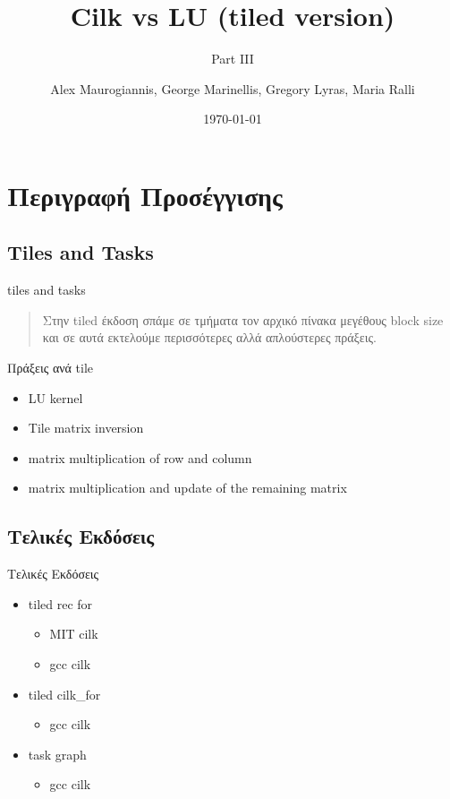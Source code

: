 \documentclass{beamer}
\author[afein,fedjo,mastergreg,mariaral]{Alex Maurogiannis, George Marinellis, Gregory Lyras, Maria Ralli}
\institute{CSlab @ NTUA}
\title{Cilk vs LU (tiled version)}
\subtitle{Part III}
\date{\today}
\begin{document}
\begin{frame}
    \titlepage
\end{frame}

\section{Περιγραφή Προσέγγισης}
\subsection{Tiles and Tasks}
\begin{frame}{tiles and tasks}
    \begin{quote}
        Στην tiled έκδοση σπάμε σε τμήματα τον αρχικό πίνακα μεγέθους block size
        και σε αυτά εκτελούμε περισσότερες αλλά απλούστερες πράξεις.
    \end{quote}

    \begin{block}{Πράξεις ανά tile}
        \begin{itemize}
            \item<2-> LU kernel
            \item<3-> Tile matrix inversion
            \item<4-> matrix multiplication of row and column
            \item<5-> matrix multiplication and update of the remaining matrix
        \end{itemize}
    \end{block}
\end{frame}

\subsection{Τελικές Εκδόσεις}
\begin{frame}{Τελικές Εκδόσεις}
    \begin{itemize}
        \item<1-> tiled rec for
            \begin{itemize}
                \item<2-> MIT cilk
                \item<3-> gcc cilk
            \end{itemize}
        \item<4-> tiled cilk\_for
            \begin{itemize}
                \item<5-> gcc cilk
            \end{itemize}
        \item<6-> task graph
            \begin{itemize}
                \item<7-> gcc cilk
            \end{itemize}
    \end{itemize}
\end{frame}
\end{document}
